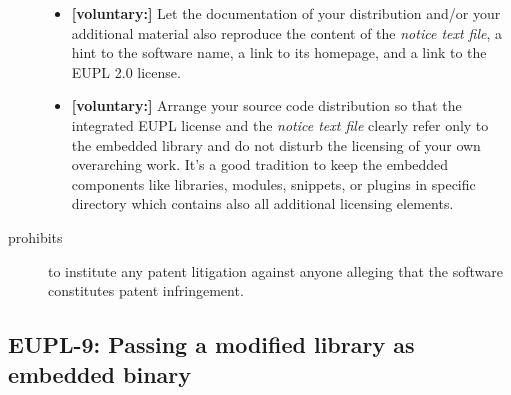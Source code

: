 \begin{description}
\begin{itemize}
  \item \textbf{[voluntary:]} Let the documentation of your distribution and/or
  your additional material also reproduce the content of the \emph{notice text
  file}, a hint to the software name, a link to its homepage, and a link to the
  EUPL 2.0 license.

  \item \textbf{[voluntary:]} Arrange your source code distribution so that the
  integrated EUPL license and the \emph{notice text file} clearly refer only
  to the embedded library and do not disturb the licensing of your own
  overarching work. It's a good tradition to keep the embedded components like
  libraries, modules, snippets, or plugins in specific directory which contains
  also all additional licensing elements.
 
\end{itemize}

\item[prohibits] to institute any patent litigation against anyone alleging that
the software constitutes patent infringement.

\end{description}


\subsection{EUPL-9: Passing a modified library as embedded binary}

